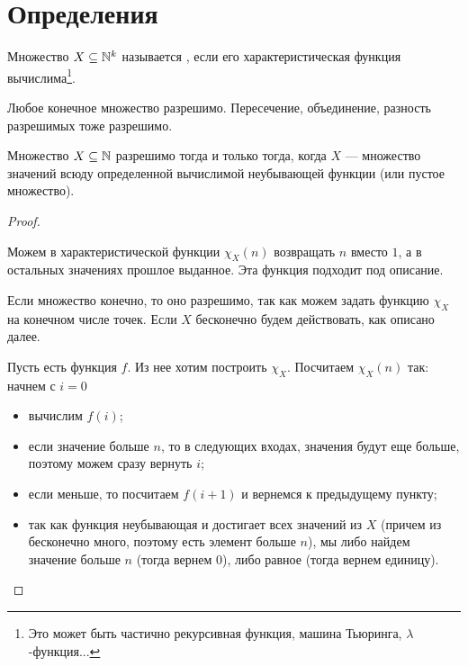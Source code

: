 \section{Определения}
\begin{defn}
	Множество $ X \subseteq \mathbb{N}^{k}$ называется , если его характеристическая функция вычислима\footnote{Это может быть частично рекурсивная функция, машина Тьюринга, $ \lambda$-функция...}.
\end{defn}
\begin{note}
    Любое конечное множество разрешимо. Пересечение, объединение, разность разрешимых тоже разрешимо.
\end{note}
\begin{thm}
	Множество $ X \subseteq \mathbb{N}$ разрешимо тогда и только тогда, когда $ X$ --- множество значений всюду определенной вычислимой неубывающей функции (или пустое множество).
\end{thm}
\begin{proof}
	~\begin{description}
		\item {} Можем в характеристической функции $ \chi_{X}(n)$ возвращать $ n$ вместо $ 1$, а в остальных значениях прошлое выданное. Эта функция подходит под описание.
        \item {} 
			Если множество конечно, то оно разрешимо, так как можем задать функцию $ \chi_X$ на конечном числе точек. 
			Если $ X$ бесконечно будем действовать, как описано далее.

			Пусть есть функция $ f$. Из нее хотим построить $ \chi_{X}$. Посчитаем $ \chi_{X}(n)$ так: 
			начнем с $ i = 0$
			\begin{itemize}
				\item вычислим $ f(i)$;
				\item если значение больше $ n$, то в следующих входах, значения будут еще больше, поэтому можем сразу вернуть  $ i$;
				\item если меньше, то посчитаем $ f(i+1)$ и вернемся к предыдущему пункту;
				\item так как функция неубывающая и достигает всех значений из $ X$ (причем из бесконечно много, поэтому есть элемент больше $ n$), мы либо найдем значение больше $ n$ (тогда вернем $ 0$), либо равное (тогда вернем единицу).
			\end{itemize}
    \end{description} 
\end{proof}



